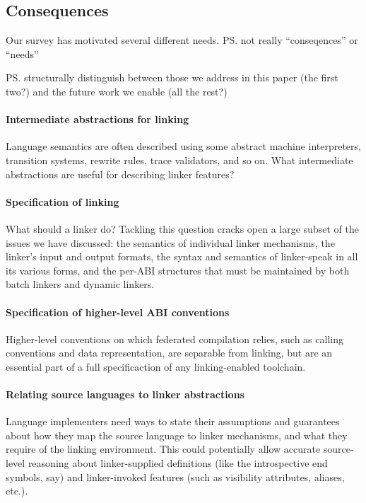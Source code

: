 \subsection{Consequences}

Our survey has motivated several different needs.
\ps{not really ``conseqences'' or ``needs''}

\ps{structurally distinguish between those we address in this paper (the
  first two?) and the future work we enable (all the rest?)}


\paragraph{Intermediate abstractions for linking}
Language semantics are often described 
using some abstract machine interpreters, 
transition systems, rewrite rules, trace validators, and so on.
What intermediate abstractions are useful for describing 
linker features?

\paragraph{Specification of linking}
What should a linker do?
Tackling this question cracks open 
a large subset of the issues we have discussed: 
the semantics of individual linker mechanisms, 
the linker's input and output formats,
the syntax and semantics of linker-speak
in all its various forms, 
and the per-ABI structures that must be maintained
by both batch linkers and dynamic linkers.

\paragraph{Specification of higher-level ABI conventions}
Higher-level conventions on which federated compilation relies, 
such as calling conventions and data representation,
are separable from linking, but 
are an essential part of a full specificaction of any linking-enabled toolchain.


\paragraph{Relating source languages to linker abstractions} 
Language implementers need ways to state their assumptions and guarantees
about how they map the source language to linker mechanisms,
and what they require of the linking environment.
This could potentially allow accurate source-level reasoning about 
linker-supplied definitions (like the introspective \textsf{end} symbols, say) 
and linker-invoked features (such as visibility attributes, aliases, etc.).
% 
% 

